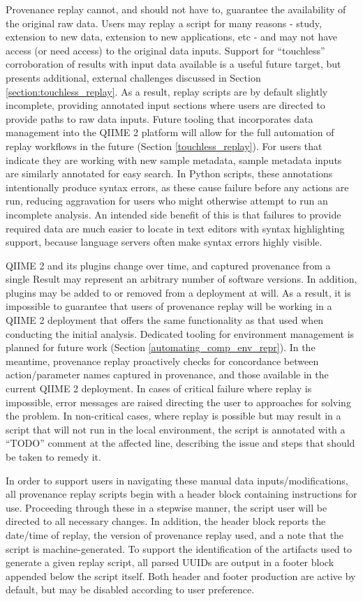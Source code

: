 Provenance replay cannot, and should not have to, guarantee the availability of
the original raw data. Users may replay a script for many reasons - study,
extension to new data, extension to new applications, etc - and may not have
access (or need access) to the original data inputs. Support for “touchless”
corroboration of results with input data available is a useful future target,
but presents additional, external challenges discussed in Section \ref{section:touchless_replay}.
As a result, replay scripts are by default slightly incomplete, providing annotated
input sections where users are directed to provide paths to raw data inputs.
Future tooling that incorporates data management into the QIIME 2 platform will
allow for the full automation of replay workflows in the future (Section
\ref{touchless_replay}). For users that indicate they are working with new sample metadata,
sample metadata inputs are similarly annotated for easy search. In Python
scripts, these annotations intentionally produce syntax errors, as these cause
failure before any actions are run, reducing aggravation for users who might
otherwise attempt to run an incomplete analysis. An intended side benefit of
this is that failures to provide required data are much easier to locate in text
editors with syntax highlighting support, because language servers often make
syntax errors highly visible.

QIIME 2 and its plugins change over time, and captured provenance from a single
Result may represent an arbitrary number of software versions. In addition,
plugins may be added to or removed from a deployment at will. As a result, it is
impossible to guarantee that users of provenance replay will be working in a
QIIME 2 deployment that offers the same functionality as that used when
conducting the initial analysis. Dedicated tooling for environment management is
planned for future work (Section \ref{automating_comp_env_repr}). In the
meantime, provenance replay proactively checks for concordance between
action/parameter names captured in provenance, and those available in the
current QIIME 2 deployment. In cases of critical failure where replay is
impossible, error messages are raised directing the user to approaches for
solving the problem. In non-critical cases, where replay is possible but may
result in a script that will not run in the local environment, the script is
annotated with a “TODO” comment at the affected line, describing the issue and
steps that should be taken to remedy it.

In order to support users in navigating these manual data inputs/modifications,
all provenance replay scripts begin with a header block containing instructions
for use. Proceeding through these in a stepwise manner, the script user will be
directed to all necessary changes. In addition, the header block reports the
date/time of replay, the version of provenance replay used, and a note that the
script is machine-generated. To support the identification of the artifacts used
to generate a given replay script, all parsed UUIDs are output in a footer block
appended below the script itself. Both header and footer production are active
by default, but may be disabled according to user preference.


